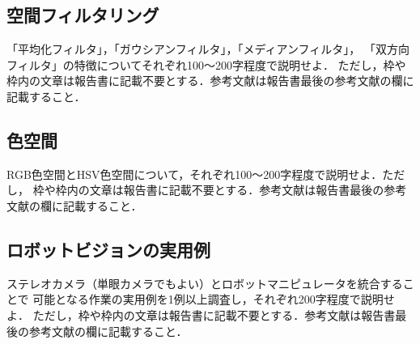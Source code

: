 \subsection{空間フィルタリング}
「平均化フィルタ」，「ガウシアンフィルタ」，「メディアンフィルタ」，
「双方向フィルタ」の特徴についてそれぞれ100〜200字程度で説明せよ．
ただし，枠や枠内の文章は報告書に記載不要とする．参考文献は報告書最後の参考文献の欄に記載すること．

\subsection{色空間}
RGB色空間とHSV色空間について，それぞれ100〜200字程度で説明せよ．ただし，
枠や枠内の文章は報告書に記載不要とする．参考文献は報告書最後の参考文献の欄に記載すること．

\subsection{ロボットビジョンの実用例}
ステレオカメラ（単眼カメラでもよい）とロボットマニピュレータを統合することで
可能となる作業の実用例を1例以上調査し，それぞれ200字程度で説明せよ．
ただし，枠や枠内の文章は報告書に記載不要とする．参考文献は報告書最後の参考文献の欄に記載すること．

